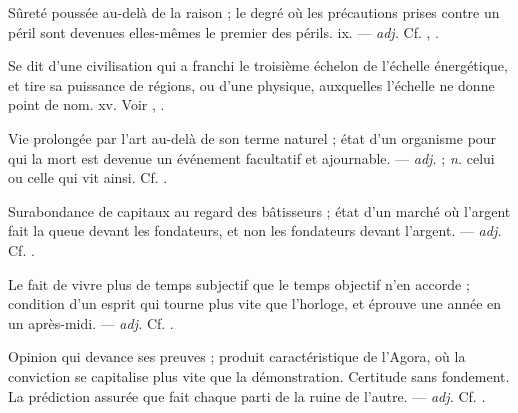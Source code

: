  Sûreté poussée au-delà de la raison ; le degré où les précautions prises contre un péril sont devenues elles-mêmes le premier des périls.   ix. ---  \textit{adj.} Cf. , .

 Se dit d'une civilisation qui a franchi le troisième échelon de l'échelle énergétique, et tire sa puissance de régions, ou d'une physique, auxquelles l'échelle ne donne point de nom.   xv. Voir , .

 Vie prolongée par l'art au-delà de son terme naturel ; état d'un organisme pour qui la mort est devenue un événement facultatif et ajournable. ---  \textit{adj.} ;  \textit{n.} celui ou celle qui vit ainsi. Cf. .

 Surabondance de capitaux au regard des bâtisseurs ; état d'un marché où l'argent fait la queue devant les fondateurs, et non les fondateurs devant l'argent.   ---  \textit{adj.} Cf. .

 Le fait de vivre plus de temps subjectif que le temps objectif n'en accorde ; condition d'un esprit qui tourne plus vite que l'horloge, et éprouve une année en un après-midi.  ---  \textit{adj.} Cf. .

 Opinion qui devance ses preuves ; produit caractéristique de l'Agora, où la conviction se capitalise plus vite que la démonstration.   Certitude sans fondement.   La prédiction assurée que fait chaque parti de la ruine de l'autre. ---  \textit{adj.} Cf. .

